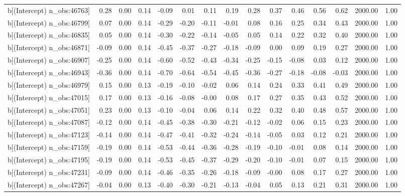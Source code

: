 \begin{table}[ht]
\begin{tabular}{rrrrrrrrrrrrrrr}
  b[(Intercept) n\_obs:46763] & 0.28 & 0.00 & 0.14 & -0.09 & 0.01 & 0.11 & 0.19 & 0.28 & 0.37 & 0.46 & 0.56 & 0.62 & 2000.00 & 1.00 \\ 
  b[(Intercept) n\_obs:46799] & 0.07 & 0.00 & 0.14 & -0.29 & -0.20 & -0.11 & -0.01 & 0.08 & 0.16 & 0.25 & 0.34 & 0.43 & 2000.00 & 1.00 \\ 
  b[(Intercept) n\_obs:46835] & 0.05 & 0.00 & 0.14 & -0.30 & -0.22 & -0.14 & -0.05 & 0.05 & 0.14 & 0.22 & 0.32 & 0.40 & 2000.00 & 1.00 \\ 
  b[(Intercept) n\_obs:46871] & -0.09 & 0.00 & 0.14 & -0.45 & -0.37 & -0.27 & -0.18 & -0.09 & 0.00 & 0.09 & 0.19 & 0.27 & 2000.00 & 1.00 \\ 
  b[(Intercept) n\_obs:46907] & -0.25 & 0.00 & 0.14 & -0.60 & -0.52 & -0.43 & -0.34 & -0.25 & -0.15 & -0.08 & 0.03 & 0.12 & 2000.00 & 1.00 \\ 
  b[(Intercept) n\_obs:46943] & -0.36 & 0.00 & 0.14 & -0.70 & -0.64 & -0.54 & -0.45 & -0.36 & -0.27 & -0.18 & -0.08 & -0.03 & 2000.00 & 1.00 \\ 
  b[(Intercept) n\_obs:46979] & 0.15 & 0.00 & 0.13 & -0.19 & -0.10 & -0.02 & 0.06 & 0.14 & 0.24 & 0.33 & 0.41 & 0.49 & 2000.00 & 1.00 \\ 
  b[(Intercept) n\_obs:47015] & 0.17 & 0.00 & 0.13 & -0.16 & -0.08 & -0.00 & 0.08 & 0.17 & 0.27 & 0.35 & 0.43 & 0.52 & 2000.00 & 1.00 \\ 
  b[(Intercept) n\_obs:47051] & 0.23 & 0.00 & 0.13 & -0.10 & -0.04 & 0.06 & 0.14 & 0.22 & 0.32 & 0.40 & 0.48 & 0.57 & 2000.00 & 1.00 \\ 
  b[(Intercept) n\_obs:47087] & -0.12 & 0.00 & 0.14 & -0.45 & -0.38 & -0.30 & -0.21 & -0.12 & -0.02 & 0.06 & 0.15 & 0.23 & 2000.00 & 1.00 \\ 
  b[(Intercept) n\_obs:47123] & -0.14 & 0.00 & 0.14 & -0.47 & -0.41 & -0.32 & -0.24 & -0.14 & -0.05 & 0.03 & 0.12 & 0.21 & 2000.00 & 1.00 \\ 
  b[(Intercept) n\_obs:47159] & -0.19 & 0.00 & 0.14 & -0.53 & -0.44 & -0.36 & -0.28 & -0.19 & -0.10 & -0.01 & 0.08 & 0.14 & 2000.00 & 1.00 \\ 
  b[(Intercept) n\_obs:47195] & -0.19 & 0.00 & 0.14 & -0.53 & -0.45 & -0.37 & -0.29 & -0.20 & -0.10 & -0.01 & 0.07 & 0.15 & 2000.00 & 1.00 \\ 
  b[(Intercept) n\_obs:47231] & -0.09 & 0.00 & 0.14 & -0.46 & -0.35 & -0.26 & -0.18 & -0.09 & -0.00 & 0.08 & 0.17 & 0.27 & 2000.00 & 1.00 \\ 
  b[(Intercept) n\_obs:47267] & -0.04 & 0.00 & 0.13 & -0.40 & -0.30 & -0.21 & -0.13 & -0.04 & 0.05 & 0.13 & 0.21 & 0.31 & 2000.00 & 1.00 \\ 

\end{tabular}
\end{table}
